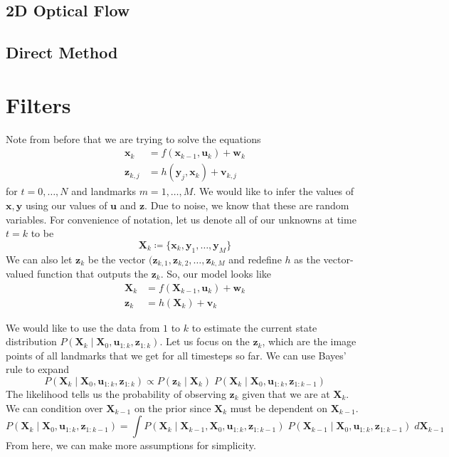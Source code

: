 \documentclass{article}
\theoremstyle{definition}
\theoremstyle{remark}
\theoremstyle{definition}
\begin{document}
\subsection{2D Optical Flow}


\subsection{Direct Method}



\section{Filters}

Note from before that we are trying to solve the equations 
\begin{align*}
    \mathbf{x}_{k} & = f(\mathbf{x}_{k-1}, \mathbf{u}_k) + \mathbf{w}_k \\
    \mathbf{z}_{k, j} & = h (\mathbf{y}_j , \mathbf{x}_k) + \mathbf{v}_{k, j}
\end{align*}
for $t = 0, \ldots, N$ and landmarks $m = 1, \ldots, M$. We would like to infer the values of $\mathbf{x}, \mathbf{y}$ using our values of $\mathbf{u}$ and $\mathbf{z}$. Due to noise, we know that these are random variables. For convenience of notation, let us denote all of our unknowns at time $t = k$ to be
\[\mathbf{X}_{k} \coloneqq \{\mathbf{x}_k, \mathbf{y}_1, \ldots, \mathbf{y}_M\}\]
We can also let $\mathbf{z}_k$ be the vector $(\mathbf{z}_{k, 1}, \mathbf{z}_{k, 2}, \ldots, \mathbf{z}_{k, M}$ and redefine $h$ as the vector-valued function that outputs the $\mathbf{z}_k$. So, our model looks like 
\begin{align*}
    \mathbf{X}_{k} & = f(\mathbf{X}_{k-1}, \mathbf{u}_k) + \mathbf{w}_k \\
    \mathbf{z}_{k} & = h (\mathbf{X}_k) + \mathbf{v}_{k}
\end{align*}

We would like to use the data from $1$ to $k$ to estimate the current state distribution $P (\mathbf{X}_k \mid \mathbf{X}_0, \mathbf{u}_{1:k}, \mathbf{z}_{1:k})$. Let us focus on the $\mathbf{z}_k$, which are the image points of all landmarks that we get for all timesteps so far. We can use Bayes' rule to expand 
\[P (\mathbf{X}_k \mid \mathbf{X}_0, \mathbf{u}_{1:k}, \mathbf{z}_{1:k}) \propto P(\mathbf{z}_k \mid \mathbf{X}_k) \; P(\mathbf{X}_k \mid \mathbf{X}_0, \mathbf{u}_{1:k}, \mathbf{z}_{1:k-1})\]
The likelihood tells us the probability of observing $\mathbf{z}_k$ given that we are at $\mathbf{X}_k$. We can condition over $\mathbf{X}_{k-1}$ on the prior since $\mathbf{X}_k$ must be dependent on $\mathbf{X}_{k-1}$. 
\[P(\mathbf{X}_k \mid \mathbf{X}_0, \mathbf{u}_{1:k}, \mathbf{z}_{1:k-1}) = \int P(\mathbf{X}_k \mid \mathbf{X}_{k-1}, \mathbf{X}_0, \mathbf{u}_{1:k}, \mathbf{z}_{1: k-1}) \; P (\mathbf{X}_{k-1} \mid \mathbf{X}_0, \mathbf{u}_{1:k}, \mathbf{z}_{1:k-1}) \; d \mathbf{X}_{k-1}\]
From here, we can make more assumptions for simplicity. 
\end{document}
